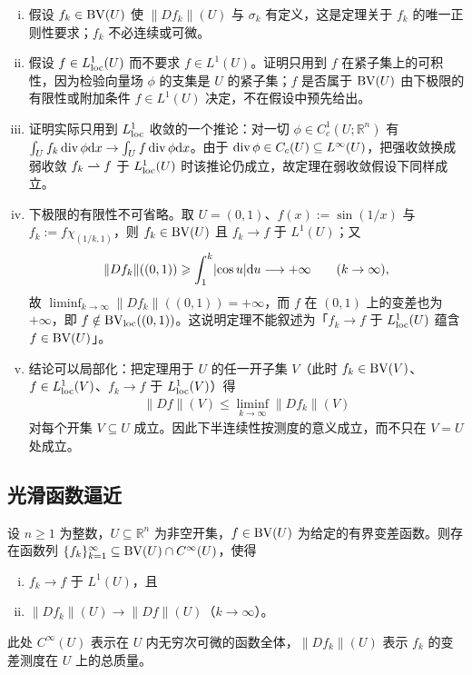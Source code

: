 \documentclass[../../main.tex]{subfiles}%
\begin{document}
\begin{remark}\label{remark:ch05-thm-5-2-条件}
\begin{enumerate}[(i)]
\item 假设 $f_k\in\mathrm{BV}(U)$ 使 $\lVert Df_k\rVert(U)$ 与 $\sigma_k$ 有定义，这是定理关于 $f_k$ 的唯一正则性要求；$f_k$ 不必连续或可微。
\item 假设 $f\in L^1_{\mathrm{loc}}(U)$ 而不要求 $f\in L^1(U)$。证明只用到 $f$ 在紧子集上的可积性，因为检验向量场 $\phi$ 的支集是 $U$ 的紧子集；$f$ 是否属于 $\mathrm{BV}(U)$ 由下极限的有限性或附加条件 $f\in L^1(U)$ 决定，不在假设中预先给出。
\item 证明实际只用到 $L^1_{\mathrm{loc}}$ 收敛的一个推论：对一切 $\phi\in C_c^1(U;\mathbb{R}^n)$ 有 $\int_U f_k\operatorname{div}\phi\mathrm{d} x\to\int_U f\operatorname{div}\phi\mathrm{d} x$。由于 $\operatorname{div}\phi\in C_c(U)\subseteq L^{\infty}(U)$，把强收敛换成弱收敛 $f_k\rightharpoonup f$ 于 $L^1_{\mathrm{loc}}(U)$ 时该推论仍成立，故定理在弱收敛假设下同样成立。
\item 下极限的有限性不可省略。取 $U=(0,1)$、$f(x):=\sin(1/x)$ 与 $f_k:=f\chi_{(1/k,1)}$，则 $f_k\in\mathrm{BV}(U)$ 且 $f_k\to f$ 于 $L^1(U)$；又
\begin{align*}
\lVert Df_k\rVert((0,1))\geqslant\int_1^k\lvert\cos u\rvert\mathrm{d} u\longrightarrow+\infty\qquad(k\to\infty),
\end{align*}
故 $\liminf_{k\to\infty}\lVert Df_k\rVert((0,1))=+\infty$，而 $f$ 在 $(0,1)$ 上的变差也为 $+\infty$，即 $f\notin\mathrm{BV}_{\mathrm{loc}}((0,1))$。这说明定理不能叙述为「$f_k\to f$ 于 $L^1_{\mathrm{loc}}(U)$ 蕴含 $f\in\mathrm{BV}(U)$」。
\item 结论可以局部化：把定理用于 $U$ 的任一开子集 $V$（此时 $f_k\in\mathrm{BV}(V)$、$f\in L^1_{\mathrm{loc}}(V)$、$f_k\to f$ 于 $L^1_{\mathrm{loc}}(V)$）得
\begin{align*}
\lVert Df\rVert(V)\leqslant\liminf_{k\to\infty}\lVert Df_k\rVert(V)
\end{align*}
对每个开集 $V\subseteq U$ 成立。因此下半连续性按测度的意义成立，而不只在 $V=U$ 处成立。
\end{enumerate}
\end{remark}

\subsection{光滑函数逼近}\label{subsection:ch05-02-2}

\begin{theorem}[光滑函数的局部逼近]\label{theorem:ch05-5-3}
设 $n\geqslant1$ 为整数，$U\subseteq\mathbb{R}^n$ 为非空开集，$f\in\mathrm{BV}(U)$ 为给定的有界变差函数。则存在函数列 $\{f_k\}_{k=1}^{\infty}\subseteq\mathrm{BV}(U)\cap C^{\infty}(U)$，使得
\begin{enumerate}[(i)]
\item $f_k\to f$ 于 $L^1(U)$，且
\item $\lVert Df_k\rVert(U)\to\lVert Df\rVert(U)$（$k\to\infty$）。
\end{enumerate}
此处 $C^{\infty}(U)$ 表示在 $U$ 内无穷次可微的函数全体，$\lVert Df_k\rVert(U)$ 表示 $f_k$ 的变差测度在 $U$ 上的总质量。
\end{theorem}
\end{document}
